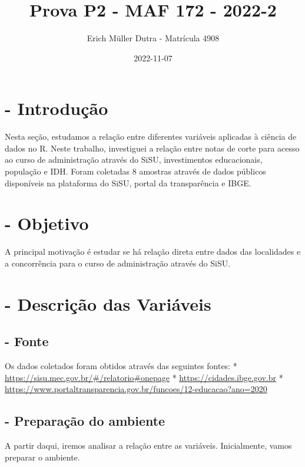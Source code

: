 \documentclass[
]{article}
\title{Prova P2 - MAF 172 - 2022-2}
\author{Erich Müller Dutra - Matrícula 4908}
\date{2022-11-07}
\begin{document}
\maketitle

{
\setcounter{tocdepth}{2}
\tableofcontents
}
\hypertarget{introduuxe7uxe3o}{%
\section{- Introdução}\label{introduuxe7uxe3o}}

Nesta seção, estudamos a relação entre diferentes variáveis aplicadas à
ciência de dados no R. Neste trabalho, investiguei a relação entre notas
de corte para acesso ao curso de administração através do SiSU,
investimentos educacionais, população e IDH. Foram coletadas 8 amostras
através de dados públicos disponíveis na plataforma do SiSU, portal da
transparência e IBGE.

\hypertarget{objetivo}{%
\section{- Objetivo}\label{objetivo}}

A principal motivação é estudar se há relação direta entre dados das
localidades e a concorrência para o curso de administração através do
SiSU.

\hypertarget{descriuxe7uxe3o-das-variuxe1veis}{%
\section{- Descrição das
Variáveis}\label{descriuxe7uxe3o-das-variuxe1veis}}

\hypertarget{fonte}{%
\subsection{- Fonte}\label{fonte}}

Os dados coletados foram obtidos através das seguintes fontes: *
\url{https://sisu.mec.gov.br/\#/relatorio\#onepage} *
\url{https://cidades.ibge.gov.br} *
\url{https://www.portaltransparencia.gov.br/funcoes/12-educacao?ano=2020}

\hypertarget{preparauxe7uxe3o-do-ambiente}{%
\subsection{- Preparação do
ambiente}\label{preparauxe7uxe3o-do-ambiente}}

A partir daqui, iremos analisar a relação entre as variáveis.
Inicialmente, vamos preparar o ambiente.
\end{document}
